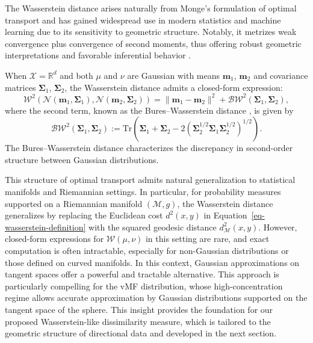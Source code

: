 \documentclass[10pt]{article}
\newcommand{\bfSigma}{\boldsymbol{\Sigma}}
\newcommand{\bbR}{\mathbb{R}}
\begin{document}
The Wasserstein distance arises naturally from Monge's formulation of optimal transport and has gained widespread use in modern statistics and machine learning due to its sensitivity to geometric structure. Notably, it metrizes weak convergence plus convergence of second moments, thus offering robust geometric interpretations and favorable inferential behavior \citep{panaretos_2020_InvitationStatisticsWasserstein, you_2024_WassersteinMedianProbability}.

When $\mathcal{X} = \bbR^d$ and both $\mu$ and $\nu$ are Gaussian with means $\boldsymbol{m}_1$, $\boldsymbol{m}_2$ and covariance matrices $\bfSigma_1$, $\bfSigma_2$, the Wasserstein distance admits a closed-form expression: \begin{equation}\label{eq-wasserstein-gaussian-general} \mathcal{W}^2(\mathcal{N}(\boldsymbol{m}_1, \bfSigma_1), \mathcal{N}(\boldsymbol{m}_2, \bfSigma_2)) = \|\boldsymbol{m}_1 - \boldsymbol{m}_2\|^2 + \mathcal{BW}^2(\bfSigma_1, \bfSigma_2), \end{equation} where the second term, known as the Bures–Wasserstein distance \citep{takatsu_2011_WassersteinGeometryGaussian}, is given by \begin{equation}\label{eq-bures-wasserstein} \mathcal{BW}^2(\bfSigma_1, \bfSigma_2) := \mathrm{Tr} \left( \bfSigma_1 + \bfSigma_2 - 2\left( \bfSigma_2^{1/2} \bfSigma_1 \bfSigma_2^{1/2} \right)^{1/2} \right). \end{equation} The Bures–Wasserstein distance characterizes the discrepancy in second-order structure between Gaussian distributions.

This structure of optimal transport admits natural generalization to statistical manifolds and Riemannian settings. In particular, for probability measures supported on a Riemannian manifold $(\mathcal{M}, g)$, the Wasserstein distance generalizes by replacing the Euclidean cost $d^2(x, y)$ in Equation~\eqref{eq-wasserstein-definition} with the squared geodesic distance $d_{\mathcal{M}}^2(x, y)$. However, closed-form expressions for $\mathcal{W}(\mu, \nu)$ in this setting are rare, and exact computation is often intractable, especially for non-Gaussian distributions or those defined on curved manifolds. In this context, Gaussian approximations on tangent spaces offer a powerful and tractable alternative. This approach is particularly compelling for the vMF distribution, whose high-concentration regime allows accurate approximation by Gaussian distributions supported on the tangent space of the sphere. This insight provides the foundation for our proposed Wasserstein-like dissimilarity measure, which is tailored to the geometric structure of directional data and developed in the next section.
\end{document}
